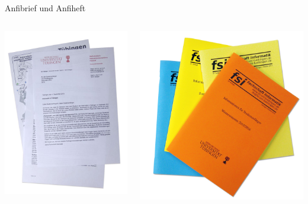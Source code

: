 \documentclass{beamer}
\begin{document}
	\begin{frame}{Anfibrief und Anfiheft}
		\begin{columns}
			\begin{column}{.5\linewidth}
				\includegraphics[width=\linewidth]{pictures/papierkram.jpg}
			\end{column}
			\begin{column}{.5\linewidth}
				\includegraphics[width=\linewidth]{pictures/anfihefte.png}

\end{column}
\end{columns}
\end{frame}
\end{document}
